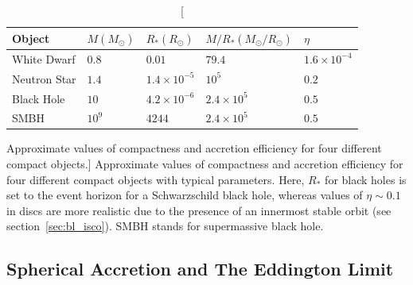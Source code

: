 \begin{table}
\centering
\begin{tabular}{p{4cm}p{2cm}p{2cm}p{3cm}p{2cm}}
\hline 
Object & $M (M_\odot)$ & $R_* (R_\odot)$ & $M/R_* (M_\odot / R_\odot)$ & $\eta$ \\ 
\hline \hline 
White Dwarf & $0.8$ & $0.01$ & $79.4$ & $1.6\times10^{-4}$ \\
Neutron Star & $1.4$ & $1.4\times10^{-5}$ & $10^5$ & $0.2$ \\
Black Hole & $10$ & $4.2\times10^{-6}$ & $2.4\times10^5$ & $0.5$ \\
SMBH & $10^9$ & $4244$ & $2.4\times10^5$ & $0.5$ \\
\hline
\end{tabular}
\centering
\caption
[Approximate values of compactness and accretion efficiency
for four different compact objects.]
{
Approximate values of compactness and accretion efficiency 
for four different compact objects with typical
parameters. Here, $R_*$ for black holes is set to the event horizon
for a Schwarzschild black hole, whereas values of $\eta \sim 0.1$ in discs 
are more realistic due to the presence of an innermost stable 
orbit (see section~\ref{sec:bl_isco}). 
SMBH stands for supermassive black hole.
}
\label{compact}
\end{table}

\subsection{Spherical Accretion and The Eddington Limit}
\label{sec:eddington}

